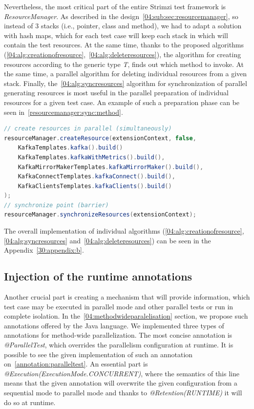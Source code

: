 Nevertheless, the most critical part of the entire Strimzi test framework is \emph{ResourceManager}.
As described in the design~\ref{04:sub:sec:resourcemanager}, so instead of 3 stacks (i.e., pointer, class and method),
we had to adapt a solution with hash maps, which for each test case will keep each stack in which will contain the test resources.
At the same time, thanks to the proposed algorithms (\ref{04:alg:creationofresource},~\ref{04:alg:deleteresources}),
the algorithm for creating resources according to the generic type \emph{T}, finds out which method to invoke.
At the same time, a parallel algorithm for deleting individual resources from a given stack.
Finally, the~\ref{04:alg:syncresources} algorithm for synchronization of parallel generating resources is most useful
in the parallel preparation of individual resources for a given test case.
An example of such a preparation phase can be seen in~\ref{resourcemanager:sync:method}.
\begin{lstlisting}[language=Java,label=resourcemanager:sync:method,caption=Example of parallel preparation of resources,frame=tb]
// create resources in parallel (simultaneously)
resourceManager.createResource(extensionContext, false,
    KafkaTemplates.kafka().build()
    KafkaTemplates.kafkaWithMetrics().build(),
    KafkaMirrorMakerTemplates.kafkaMirrorMaker().build(),
    KafkaConnectTemplates.kafkaConnect().build(),
    KafkaClientsTemplates.kafkaClients().build()
);
// synchronize point (barrier)
resourceManager.synchronizeResources(extensionContext);
\end{lstlisting}
The overall implementation of individual algorithms (\ref{04:alg:creationofresource},\ref{04:alg:syncresources} and~\ref{04:alg:deleteresources})
can be seen in the Appendix~\ref{30:appendix:b}.

\subsection{Injection of the runtime annotations}
\label{05:sub:sec:annotations}

Another crucial part is creating a mechanism that will provide information, which test case may be executed in parallel
mode and other parallel tests or run in complete isolation.
In the~\ref{04:methodwideparalelisation} section, we propose such annotations offered by the Java language.
We implemented three types of annotations for method-wide parallelization.
The most concise annotation is \emph{@ParallelTest}, which overrides the parallelism configuration at runtime.
It is possible to see the given implementation of such an annotation on~\ref{annotation:paralleltest}.
An essential part is \emph {@Execution(ExecutionMode.CONCURRENT)}, where the semantics of this line means that the given
annotation will overwrite the given configuration from a sequential mode to parallel mode and thanks to \emph {@Retention(RUNTIME)} it will do so at runtime.

